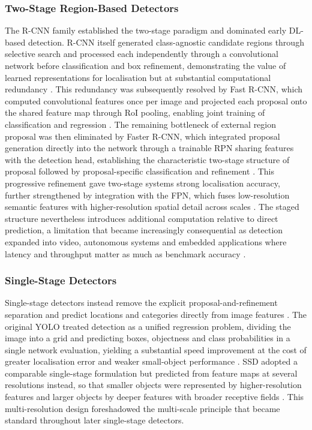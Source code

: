 \subsubsection{Two-Stage Region-Based Detectors}
\label{sec:bg-od-two-stage}
The \gls{R-CNN} family established the two-stage paradigm and dominated early \gls{DL}-based detection. \gls{R-CNN} itself generated class-agnostic candidate regions through selective search and processed each independently through a convolutional network before classification and box refinement, demonstrating the value of learned representations for localisation but at substantial computational redundancy \cite{girshick2014rcnn}. This redundancy was subsequently resolved by Fast \gls{R-CNN}, which computed convolutional features once per image and projected each proposal onto the shared feature map through \gls{RoI} pooling, enabling joint training of classification and regression \cite{girshick2015fastrcnn}. The remaining bottleneck of external region proposal was then eliminated by Faster \gls{R-CNN}, which integrated proposal generation directly into the network through a trainable \gls{RPN} sharing features with the detection head, establishing the characteristic two-stage structure of proposal followed by proposal-specific classification and refinement \cite{ren2015faster}. This progressive refinement gave two-stage systems strong localisation accuracy, further strengthened by integration with the \gls{FPN}, which fuses low-resolution semantic features with higher-resolution spatial detail across scales \cite{lin2017fpn,zou2023objectdetection}. The staged structure nevertheless introduces additional computation relative to direct prediction, a limitation that became increasingly consequential as detection expanded into video, autonomous systems and embedded applications where latency and throughput matter as much as benchmark accuracy \cite{redmon2016you,zou2023objectdetection}.

\subsubsection{Single-Stage Detectors}
\label{sec:bg-od-single-stage}
Single-stage detectors instead remove the explicit proposal-and-refinement separation and predict locations and categories directly from image features \cite{redmon2016you,liu2016ssd}. The original \gls{YOLO} treated detection as a unified regression problem, dividing the image into a grid and predicting boxes, objectness and class probabilities in a single network evaluation, yielding a substantial speed improvement at the cost of greater localisation error and weaker small-object performance \cite{redmon2016you}. \gls{SSD} adopted a comparable single-stage formulation but predicted from feature maps at several resolutions instead, so that smaller objects were represented by higher-resolution features and larger objects by deeper features with broader receptive fields \cite{liu2016ssd}. This multi-resolution design foreshadowed the multi-scale principle that became standard throughout later single-stage detectors.

